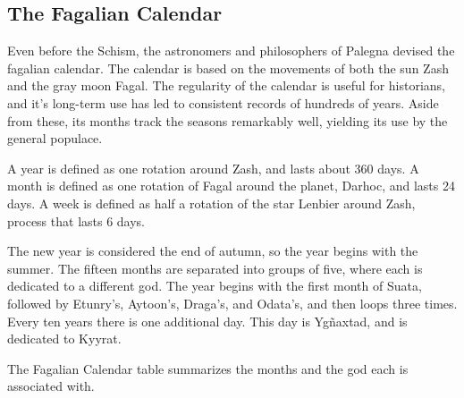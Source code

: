 \begin{linenumbers}

\subsection*{The Fagalian Calendar}
Even before the Schism, the astronomers and philosophers of Palegna devised the fagalian calendar.
The calendar is based on the movements of both the sun Zash and the gray moon Fagal.
The regularity of the calendar is useful for historians, and it's long-term use has led to consistent records of hundreds of years.
Aside from these, its months track the seasons remarkably well, yielding its use by the general populace.

A year is defined as one rotation around Zash, and lasts about 360 days.
A month is defined as one rotation of Fagal around the planet, Darhoc, and lasts 24 days.
A week is defined as half a rotation of the star Lenbier around Zash, process that lasts 6 days.

The new year is considered the end of autumn, so the year begins with the summer.
The fifteen months are separated into groups of five, where each is dedicated to a different god.
The year begins with the first month of Suata, followed by Etunry's, Aytoon's, Draga's, and Odata's, and then loops three times.
Every ten years there is one additional day.
This day is Yg\~naxtad, and is dedicated to Kyyrat.

The Fagalian Calendar table summarizes the months and the god each is associated with.


\end{linenumbers}

